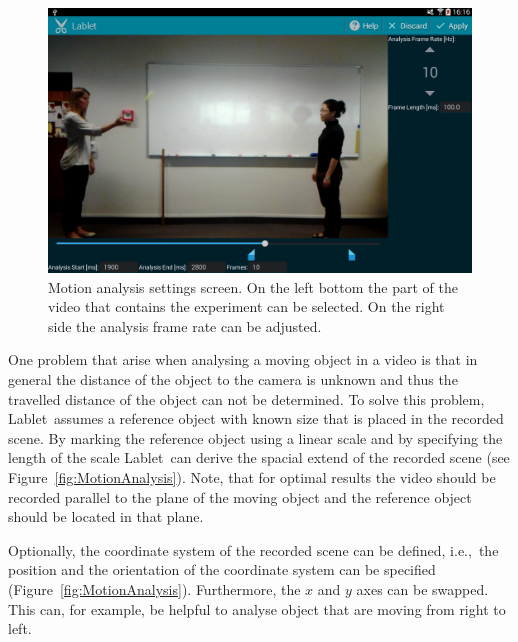 \documentclass{sigchi}
\newcommand{\ie}{i.e.,\ }
\newcommand{\lablet}{Lablet\ }
\begin{document}
\begin{figure}
  \centering
  \includegraphics[width=.99\columnwidth]{MotionAnalysisSettings}
  \caption{Motion analysis settings screen.
  On the left bottom the part of the video that contains the experiment can be selected.
On the right side the analysis frame rate can be adjusted.\label{fig:MotionAnalysisSettingsScreen}}
\end{figure}

One problem that arise when analysing a moving object in a video is that in general the distance of the object to the camera is unknown and thus the travelled distance of the object can not be determined.
To solve this problem, \lablet assumes a reference object with known size that is placed in the recorded scene.
By marking the reference object using a linear scale and by specifying the length of the scale \lablet can derive the spacial extend of the recorded scene (see Figure~\ref{fig:MotionAnalysis}).
Note, that for optimal results the video should be recorded parallel to the plane of the moving object and the reference object should be located in that plane.

Optionally, the coordinate system of the recorded scene can be defined, \ie the position and the orientation of the coordinate system can be specified (Figure~\ref{fig:MotionAnalysis}).
Furthermore, the $x$ and $y$ axes can be swapped.
This can, for example, be helpful to analyse object that are moving from right to left.
\end{document}
